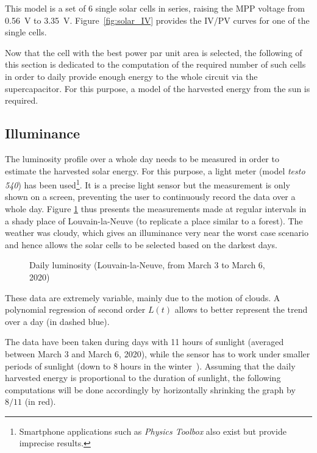 \documentclass{EPL-master-thesis-covers-EN}
\newcommand{\te}[1]{\textrm{#1}}
\begin{document}
This model is a set of 6 single solar cells in series, raising the MPP voltage from \SI{0.56}{V} to \SI{3.35}{V}. Figure~\ref{fig:solar_IV} provides the IV/PV curves for one of the single cells.

Now that the cell with the best power par unit area is selected, the following of this section is dedicated to the computation of the required number of such cells in order to daily provide enough energy to the whole circuit via the supercapacitor. For this purpose, a model of the harvested energy from the sun is required.


\subsection*{Illuminance}

The luminosity profile over a whole day needs to be measured in order to estimate the harvested solar energy. For this purpose, a light meter (model \textit{testo 540}) has been used\footnote{Smartphone applications such as \textit{Physics Toolbox} also exist but provide imprecise results.}. It is a precise light sensor but the measurement is only shown on a screen, preventing the user to continuously record the data over a whole day. Figure \ref{fig:daily_luminosity} thus presents the measurements made at regular intervals in a shady place of Louvain-la-Neuve (to replicate a place similar to a forest). The weather was cloudy, which gives an illuminance very near the worst case scenario and hence allows the solar cells to be selected based on the darkest days.

\begin{figure}[H]
    \centering
    
    \caption{Daily luminosity (Louvain-la-Neuve, from March 3 to March 6, 2020)}
    \label{fig:daily_luminosity}
\end{figure}

These data are extremely variable, mainly due to the motion of clouds. A polynomial regression of second order $L(t)$ allows to better represent the trend over a day (in dashed blue).

The data have been taken during days with 11 hours of sunlight (averaged between March 3 and March 6, 2020), while the sensor has to work under smaller periods of sunlight (down to 8 hours in the winter~\cite{sunlight}). Assuming that the daily harvested energy is proportional to the duration of sunlight, the following computations will be done accordingly by horizontally shrinking the graph by $8/11$ (in red).
\end{document}
